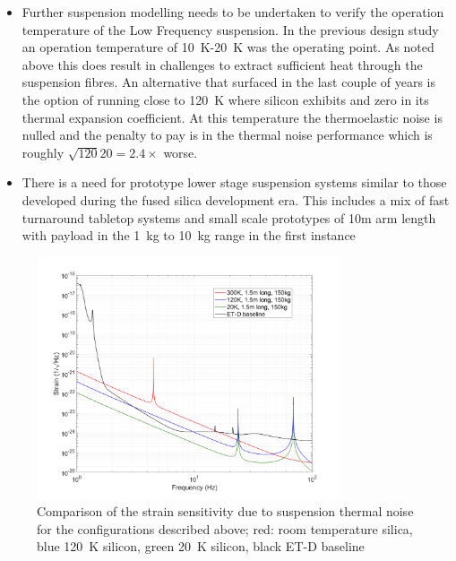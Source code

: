 \begin{itemize}
\item Further suspension modelling needs to be undertaken to verify the operation temperature of the Low Frequency suspension. In the previous design study an operation temperature of 10~K-20~K  was the operating point. As noted above this does result in challenges to extract sufficient heat through the suspension fibres. An alternative that surfaced in the last couple of years is the option of running close to 120~K where silicon exhibits and zero in its thermal expansion coefficient. At this temperature the thermoelastic noise is nulled and the penalty to pay is in the thermal noise performance which is roughly $\sqrt{120}{20}=2.4\times$ worse. 

\item There is a need for prototype lower stage suspension systems similar to those developed during the fused silica development era. This includes a mix of fast turnaround tabletop systems and small scale prototypes of 10m arm length with payload in the 1~kg to 10~kg range in the first instance

\end{itemize}

\begin{figure}
    \centering
    \includegraphics[width=0.8\textwidth]{./Detector/SASandSUS/SuspensionSystems/Suspension_Figures/susp_thermal.png}
\caption{Comparison of the strain sensitivity due to suspension thermal noise for the configurations described above; red: room temperature silica, blue 120~K silicon, green 20~K silicon, black ET-D baseline}
    \label{susp_thermal}
\end{figure}

